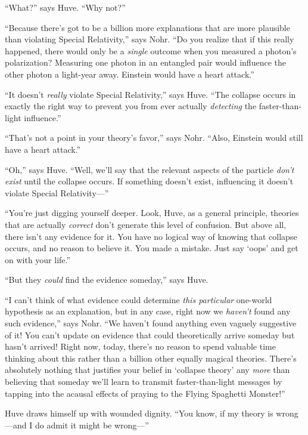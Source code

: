 {
 ``What?'' says Huve.
``Why not?''}

{
 ``Because there's got to be a
billion more explanations that are more plausible than violating
Special Relativity,'' says Nohr.
``Do you realize that if this really happened, there
would only be a \textit{single} outcome when you measured a
photon's polarization? Measuring one photon in an
entangled pair would influence the other photon a light-year away.
Einstein would have a heart attack.''}

{
 ``It doesn't \textit{really}
violate Special Relativity,'' says Huve.
``The collapse occurs in exactly the right way to
prevent you from ever actually \textit{detecting} the faster-than-light
influence.''}

{
 ``That's not a point in your
theory's favor,'' says Nohr.
``Also, Einstein would still have a heart
attack.''}

{
 ``Oh,'' says Huve.
``Well, we'll say that the relevant
aspects of the particle \textit{don't exist} until the
collapse occurs. If something doesn't exist,
influencing it doesn't violate Special
Relativity---''}

{
 ``You're just digging yourself
deeper. Look, Huve, as a general principle, theories that are actually
\textit{correct} don't generate this level of
confusion. But above all, there isn't any evidence for
it. You have no logical way of knowing that collapse occurs, and no
reason to believe it. You made a mistake. Just say
`oops' and get on with your
life.''}

{
 ``But they \textit{could} find the evidence
someday,'' says Huve.}

{
 ``I can't think of what evidence
could determine \textit{this particular} one-world hypothesis as an
explanation, but in any case, right now we
\textit{haven't} found any such
evidence,'' says Nohr. ``We
haven't found anything even vaguely suggestive of it!
You can't update on evidence that could theoretically
arrive someday but hasn't arrived! Right now, today,
there's no reason to spend valuable time thinking about
this rather than a billion other equally magical theories.
There's absolutely nothing that justifies your belief
in `collapse theory' any \textit{more}
than believing that someday we'll learn to transmit
faster-than-light messages by tapping into the acausal effects of
praying to the Flying Spaghetti Monster!''}

{
 Huve draws himself up with wounded dignity. ``You
know, if my theory is wrong---and I do admit it might be
wrong---''}

